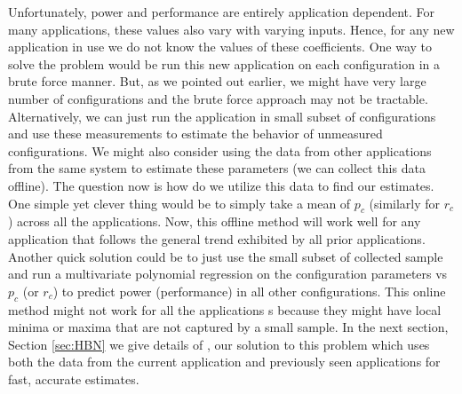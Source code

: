 Unfortunately, power and performance are entirely application
dependent.  For many applications, these values also vary with varying
inputs.  Hence, for any new application in use we do not know the
values of these coefficients. One way to solve the problem would be
run this new application on each configuration in a brute force
manner. But, as we pointed out earlier, we might have very large
number of configurations and the brute force approach may not be
tractable. Alternatively, we can just run the application in small
subset of configurations and use these measurements to estimate the
behavior of unmeasured configurations.  We might also consider using
the data from other applications from the same system to estimate
these parameters (we can collect this data offline). The question now
is how do we utilize this data to find our estimates. One simple yet
clever thing would be to simply take a mean of $p_c$ (similarly for
$r_c$) across all the applications. Now, this offline method will work
well for any application that follows the general trend exhibited by
all prior applications. Another quick solution could be to just use
the small subset of collected sample and run a multivariate polynomial
regression on the configuration parameters vs $p_c$ (or $r_c$) to
predict power (performance) in all other configurations.  This online
method might not work for all the applications s because they might
have local minima or maxima that are not captured by a small sample.
In the next section, Section \ref{sec:HBN} we give details of
\SYSTEM{}, our solution to this problem which uses both the data from
the current application and previously seen applications for fast,
accurate estimates.
